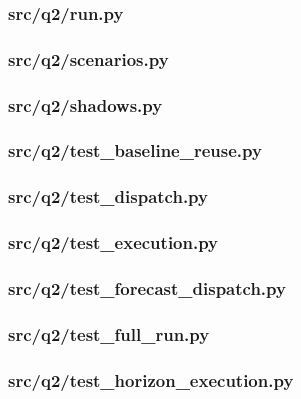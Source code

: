 \documentclass[zihao=-4,a4paper,UTF8,fontset=none]{ctexart}
\begin{document}
\subsubsection*{src/q2/run.py}


\subsubsection*{src/q2/scenarios.py}


\subsubsection*{src/q2/shadows.py}


\subsubsection*{src/q2/test\_baseline\_reuse.py}


\subsubsection*{src/q2/test\_dispatch.py}


\subsubsection*{src/q2/test\_execution.py}


\subsubsection*{src/q2/test\_forecast\_dispatch.py}


\subsubsection*{src/q2/test\_full\_run.py}


\subsubsection*{src/q2/test\_horizon\_execution.py}

\end{document}
